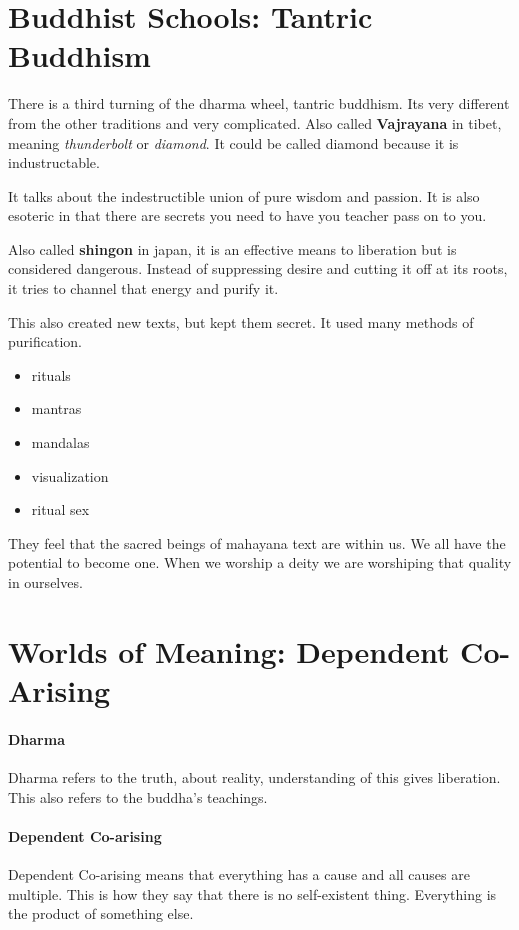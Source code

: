 \documentclass{article}
\begin{document}
\section*{Buddhist Schools: Tantric Buddhism}
\label{sec:tantric_buddhism}
There is a third turning of the dharma wheel, tantric buddhism. Its very different from the other traditions and very complicated. Also called \textbf{Vajrayana} in tibet, meaning \emph{thunderbolt} or \emph{diamond}. It could be called diamond because it is industructable.

It talks about the indestructible union of pure wisdom and passion. It is also esoteric in that there are secrets you need to have you teacher pass on to you.

Also called \textbf{shingon} in japan, it is an effective means to liberation but is considered dangerous. Instead of suppressing desire and cutting it off at its roots, it tries to channel that energy and purify it.

This also created new texts, but kept them secret. It used many methods of purification.
\begin{itemize}
	\item rituals
	\item mantras
	\item mandalas
	\item visualization
	\item ritual sex
\end{itemize}

They feel that the sacred beings of mahayana text are within us. We all have the potential to become one. When we worship a deity we are worshiping that quality in ourselves.

\section*{Worlds of Meaning: Dependent Co-Arising}
\label{sec:dependent_co_arising}
\paragraph{Dharma}
\label{par:dharma}
Dharma refers to the truth, about reality, understanding of this gives liberation. This also refers to the buddha's teachings.

\paragraph{Dependent Co-arising}
\label{par:dependent_co_arising}
Dependent Co-arising means that everything has a cause and all causes are multiple. This is how they say that there is no self-existent thing. Everything is the product of something else.
\end{document}
